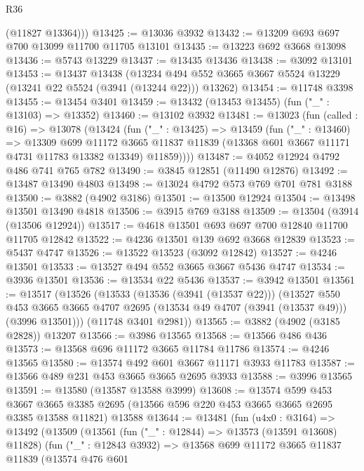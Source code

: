 \begin{lexlean}{R36}
\begin{coremodule}
        (@11827 @13364)))
@13425 := @13036 @3932
@13432 := @13209 @693 @697 @700 @13099 @11700 @11705 @13101
@13435 := @13223 @692 @3668 @13098
@13436 := @5743 @13229
@13437 := @13435 @13436
@13438 := @3092 @13101
@13453 := @13437
    @13438
    (@13234 @494 @552 @3665 @3667 @5524 @13229 (@13241 @22 @5524 (@3941 (@13244 @22))) @13262)
@13454 := @11748 @3398
@13455 := @13454 @3401
@13459 := @13432 (@13453 @13455) (fun ("_" : @13103) => @13352)
@13460 := @13102 @3932
@13481 := @13023
    (fun (called : @16) =>
    @13078
      (@13424
        (fun ("_" : @13425) =>
        @13459
          (fun ("_" : @13460) =>
          @13309
            @699
            @11172
            @3665
            @11837
            @11839
            (@13368 @601 @3667 @11171 @4731 @11783 @13382 @13349)
            @11859))))
@13487 := @4052 @12924 @4792 @486 @741 @765 @782
@13490 := @3845 @12851 (@11490 @12876)
@13492 := @13487 @13490 @4803
@13498 := @13024 @4792 @573 @769 @701 @781 @3188
@13500 := @3882 (@4902 @3186)
@13501 := @13500 @12924
@13504 := @13498 @13501 @13490 @4818
@13506 := @3915 @769 @3188
@13509 := @13504 (@3914 (@13506 @12924))
@13517 := @4618 @13501 @693 @697 @700 @12840 @11700 @11705 @12842
@13522 := @4236 @13501 @139 @692 @3668 @12839
@13523 := @5437 @4747
@13526 := @13522 @13523 (@3092 @12842)
@13527 := @4246 @13501
@13533 := @13527 @494 @552 @3665 @3667 @5436 @4747
@13534 := @3936 @13501
@13536 := @13534 @22 @5436
@13537 := @3942 @13501
@13561 := @13517
    (@13526
      (@13533
        (@13536 (@3941 (@13537 @22)))
        (@13527
          @550
          @453
          @3665
          @3665
          @4707
          @2695
          (@13534 @49 @4707 (@3941 (@13537 @49)))
          (@3996 @13501)))
      (@11748 @3401 @2981))
@13565 := @3882 (@4902 (@3185 @2828)) @13207
@13566 := @3986 @13565
@13568 := @13566 @486 @436
@13573 := @13568 @696 @11172 @3665 @11784 @11786
@13574 := @4246 @13565
@13580 := @13574 @492 @601 @3667 @11171 @3933 @11783
@13587 := @13566 @489 @231 @453 @3665 @3665 @2695 @3933
@13588 := @3996 @13565
@13591 := @13580 (@13587 @13588 @3999)
@13608 := @13574
    @599
    @453
    @3667
    @3665
    @3385
    @2695
    (@13566 @596 @220 @453 @3665 @3665 @2695 @3385 @13588 @11821)
    @13588
@13644 := @13481
    (fun (u4x0 : @3164) =>
    @13492
      (@13509
        (@13561
          (fun ("_" : @12844) => @13573 (@13591 @13608) @11828)
          (fun ("_" : @12843 @3932) =>
          @13568
            @699
            @11172
            @3665
            @11837
            @11839
            (@13574
              @476
              @601

\end{coremodule}
\end{lexlean}
